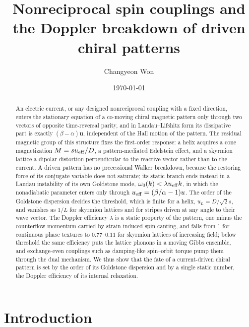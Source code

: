 \documentclass[prb,reprint,amsmath,amssymb,superscriptaddress,floatfix]{revtex4-2}
\newcommand{\ueff}{u_{\rm eff}}
\newcommand{\vu}{\mathbf u}
\begin{document}
\title{Nonreciprocal spin couplings and the Doppler breakdown of driven chiral patterns}

\author{Changyeon Won}

\date{\today}

\begin{abstract}
An electric current, or any designed nonreciprocal coupling with a fixed direction, enters the stationary equation of a co-moving chiral magnetic pattern only through two vectors of opposite time-reversal parity, and in Landau--Lifshitz form its dissipative part is exactly $(\beta-\alpha)\vu$, independent of the Hall motion of the pattern.
The residual magnetic group of this structure fixes the first-order response: a helix acquires a cone magnetization $M=s\ueff/D$, a pattern-mediated Edelstein effect, and a skyrmion lattice a dipolar distortion perpendicular to the reactive vector rather than to the current.
A driven pattern has no precessional Walker breakdown, because the restoring force of its conjugate variable does not saturate; its static branch ends instead in a Landau instability of its own Goldstone mode, $\omega_0(k)<\lambda\ueff k$, in which the nonadiabatic parameter enters only through $\ueff=(\beta/\alpha-1)u$.
The order of the Goldstone dispersion decides the threshold, which is finite for a helix, $u_L=D/\sqrt2 s$, and vanishes as $1/L$ for skyrmion lattices and for stripes driven at any angle to their wave vector.
The Doppler efficiency $\lambda$ is a static property of the pattern, one minus the counterflow momentum carried by strain-induced spin canting, and falls from 1 for continuous phase textures to $0.77$--$0.11$ for skyrmion lattices of increasing field; below threshold the same efficiency puts the lattice phonons in a moving Gibbs ensemble, and exchange-even couplings such as damping-like spin--orbit torque pump them through the dual mechanism.
We thus show that the fate of a current-driven chiral pattern is set by the order of its Goldstone dispersion and by a single static number, the Doppler efficiency of its internal relaxation.
\end{abstract}

\maketitle

\section{Introduction}
\label{sec:intro}
\end{document}
